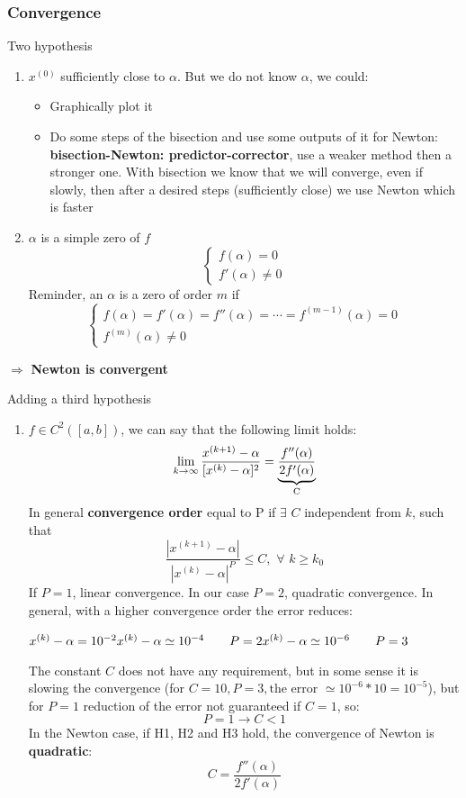\subsubsection{Convergence}
Two hypothesis
\begin{enumerate}[H1)]
    \item $x^{(0)}$ sufficiently close to $\alpha$. But we do not know $\alpha$, we could:
    \begin{itemize}
        \item Graphically plot it
        \item Do some steps of the bisection and use some outputs of it for Newton: \textbf{bisection-Newton: predictor-corrector}, use a weaker method then a stronger one. With bisection we know that we will converge, even if slowly, then after a desired steps (sufficiently close) we use Newton which is faster
    \end{itemize}
    \item $\alpha$ is a simple zero of $f$
    $$
    \begin{cases}
        f(\alpha)=0\\
        f'(\alpha)\neq 0
    \end{cases}
    $$
    Reminder, an $\alpha$ is a zero of order $m$ if
    $$
    \begin{cases}
        f(\alpha)=f'(\alpha)=f''(\alpha)=\cdots=f^{(m-1)}(\alpha)=0\\
        f^{(m)}(\alpha)\neq 0        
    \end{cases}
    $$
\end{enumerate}
$\mathbf{\Rightarrow}$ \textbf{Newton is convergent}

Adding a third hypothesis
\begin{enumerate}[H3)]
    \item $f\in C^2([a,b])$, we can say that the following limit holds:
    $$\lim_{k\rightarrow\infty}\frac{
        x^{(k+1)}-\alpha
    }{[x^{(k)}-\alpha]^2}=
    \underlabel{\frac{f''(\alpha)}{2f'(\alpha)}}{C}$$
    In general \textbf{convergence order} equal to P if $\exists\,\,C$ independent from $k$, such that
    $$\frac{|x^{(k+1)}-\alpha|}{|x^{(k)}-\alpha|^P}\leq C,\,\,\forall\,\,k\geq k_0$$
    If $P=1$, linear convergence. In our case $P=2$, quadratic convergence. In general, with a higher convergence order the error reduces:
    
    $
    x^{(k)}-\alpha=10^{-2}\\
    x^{(k)}-\alpha\simeq 10^{-4}\qquad P=2\\
    x^{(k)}-\alpha\simeq 10^{-6}\qquad P=3
    $

    The constant $C$ does not have any requirement, but in some sense it is slowing the convergence (for $C=10,P=3,\text{the error }\simeq 10^{-6}*10=10^{-5}$), but for $P=1$ reduction of the error not guaranteed if $C=1$, so:
    $$P=1\rightarrow C<1$$
    In the Newton case, if H1, H2 and H3 hold, the convergence of Newton is \textbf{quadratic}:
    $$C=\frac{f''(\alpha)}{2f'(\alpha)}$$
\end{enumerate}
